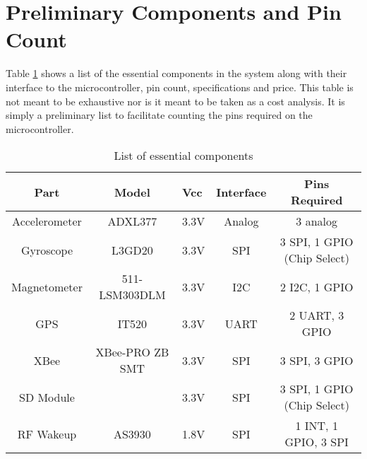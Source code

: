 \section{Preliminary Components and Pin Count}

Table \ref{tab:componentPinCount} shows a list of the essential components in the system along with their interface to the microcontroller, pin count, specifications and price.  This table is not meant to be exhaustive nor is it meant to be taken as a cost analysis.  It is simply a preliminary list to facilitate counting the pins required on the microcontroller.

\begin{table}[htbp]
  \centering
  \caption{List of essential components}
    \begin{tabular}{|c|c|m{0.35in}|c|c|}
    \hline
    Part  & Model & \centering Vcc & Interface & Pins Required \\
    \hline \hline
    Accelerometer & ADXL377 & \centering 3.3V  & Analog & 3 analog \\ \hline
    Gyroscope & L3GD20 & \centering 3.3V  & SPI   & 3 SPI, 1 GPIO (Chip Select) \\ \hline
    Magnetometer & 511-LSM303DLM & \centering 3.3V  & I2C   & 2 I2C, 1 GPIO \\ \hline
    GPS   & IT520 & \centering 3.3V   & UART  & 2 UART, 3 GPIO \\ \hline 
    XBee  & XBee-PRO ZB SMT &\centering 3.3V  & SPI   & 3 SPI, 3 GPIO \\ \hline
    SD Module &       & \centering 3.3V  & SPI   & 3 SPI, 1 GPIO (Chip Select) \\ \hline
    RF Wakeup & AS3930 & \centering 1.8V  & SPI   & 1 INT, 1 GPIO, 3 SPI \\ \hline
    
    \end{tabular}%
  \label{tab:componentPinCount}%
\end{table}%
